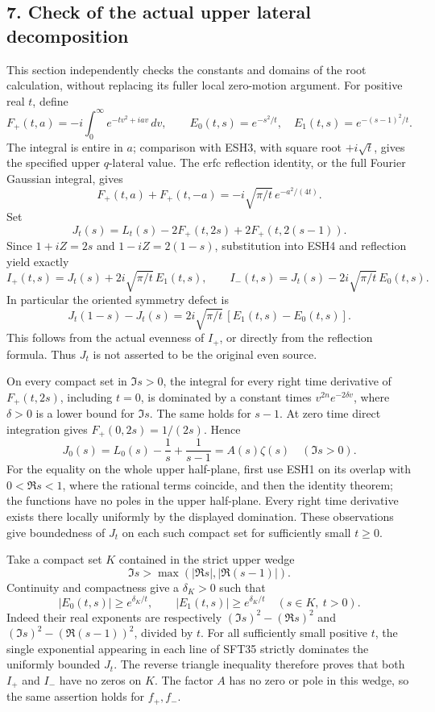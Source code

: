 \documentclass[
  10pt,
  a4paper,
]{article}
\begin{document}
\subsection{7. Check of the actual upper lateral
decomposition}\label{check-of-the-actual-upper-lateral-decomposition}

This section independently checks the constants and domains of the root
calculation, without replacing its fuller local zero-motion argument.
For positive real \(t\), define \[
 F_+(t,a)=-i\int_0^\infty e^{-tv^2+iav}\,dv,\qquad
 E_0(t,s)=e^{-s^2/t},\quad E_1(t,s)=e^{-(s-1)^2/t}.
 \tag{SFT34}
\] The integral is entire in \(a\); comparison with ESH3, with square
root \(+i\sqrt t\), gives the specified upper \(q\)-lateral value. The
erfc reflection identity, or the full Fourier Gaussian integral, gives
\[
 F_+(t,a)+F_+(t,-a)
        =-i\sqrt{\pi/t}\,e^{-a^2/(4t)}.
\] Set \[
 J_t(s)=L_t(s)-2F_+(t,2s)+2F_+(t,2(s-1)).
\] Since \(1+iZ=2s\) and \(1-iZ=2(1-s)\), substitution into ESH4 and
reflection yield exactly \[
 I_+(t,s)=J_t(s)+2i\sqrt{\pi/t}\,E_1(t,s),\qquad
 I_-(t,s)=J_t(s)-2i\sqrt{\pi/t}\,E_0(t,s).
 \tag{SFT35}
\] In particular the oriented symmetry defect is \[
 J_t(1-s)-J_t(s)
       =2i\sqrt{\pi/t}\,[E_1(t,s)-E_0(t,s)].
 \tag{SFT36}
\] This follows from the actual evenness of \(I_+\), or directly from
the reflection formula. Thus \(J_t\) is not asserted to be the original
even source.

On every compact set in \(\Im s>0\), the integral for every right time
derivative of \(F_+(t,2s)\), including \(t=0\), is dominated by a
constant times \(v^{2n}e^{-2\delta v}\), where \(\delta>0\) is a lower
bound for \(\Im s\). The same holds for \(s-1\). At zero time direct
integration gives \(F_+(0,2s)=1/(2s)\). Hence \[
 J_0(s)=L_0(s)-\frac1s+\frac1{s-1}=A(s)\zeta(s)
       \quad(\Im s>0).
 \tag{SFT37}
\] For the equality on the whole upper half-plane, first use ESH1 on its
overlap with \(0<\Re s<1\), where the rational terms coincide, and then
the identity theorem; the functions have no poles in the upper
half-plane. Every right time derivative exists there locally uniformly
by the displayed domination. These observations give boundedness of
\(J_t\) on each such compact set for sufficiently small \(t\ge0\).

Take a compact set \(K\) contained in the strict upper wedge \[
 \Im s>\max(|\Re s|,|\Re(s-1)|).
 \tag{SFT38}
\] Continuity and compactness give a \(\delta_K>0\) such that \[
 |E_0(t,s)|\ge e^{\delta_K/t},\qquad
 |E_1(t,s)|\ge e^{\delta_K/t}
       \quad(s\in K,\ t>0).
\] Indeed their real exponents are respectively \((\Im s)^2-(\Re s)^2\)
and \((\Im s)^2-(\Re(s-1))^2\), divided by \(t\). For all sufficiently
small positive \(t\), the single exponential appearing in each line of
SFT35 strictly dominates the uniformly bounded \(J_t\). The reverse
triangle inequality therefore proves that both \(I_+\) and \(I_-\) have
no zeros on \(K\). The factor \(A\) has no zero or pole in this wedge,
so the same assertion holds for \(f_+,f_-\).
\end{document}

